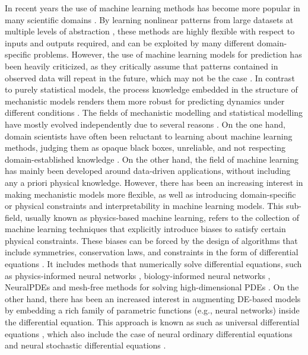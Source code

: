 In recent years the use of machine learning methods has become more popular in many scientific domains \cite{rasp2018, pichler2023, meuwly2021machine, borowiec2022, lai2024machine}. 
By learning nonlinear patterns from large datasets at multiple levels of abstraction \cite{LeCun2015}, these methods are highly flexible with respect to inputs and outputs required, and can be exploited by many different domain-specific problems.
However, the use of machine learning models for prediction has been heavily criticized, as they critically assume that patterns contained in observed data will repeat in the future, which may not be the case \cite{dormann2007,Barnosky2012}. 
In contrast to purely statistical models, the process knowledge embedded in the structure of mechanistic models renders them more robust for predicting dynamics under different conditions \cite{Barnosky2012}.
The fields of mechanistic modelling and statistical modelling have mostly evolved independently due to several reasons \cite{zdeborova_understanding_2020}. 
On the one hand, domain scientists have often been reluctant to learning about machine learning methods, judging them as opaque black boxes, unreliable, and not respecting domain-established knowledge \cite{Coveney:2016eb}. 
On the other hand, the field of machine learning has mainly been developed around data-driven applications, without including any a priori physical knowledge. 
However, there has been an increasing interest in making mechanistic models more flexible, as well as introducing domain-specific or physical constraints and interpretability in machine learning models. 
This sub-field, usually known as physics-based machine learning, refers to the collection of machine learning techniques that explicitly introduce biases to satisfy certain physical constraints. 
These biases can be forced by the design of algorithms that include symmetries, conservation laws, and constraints in the form of differential equations \cite{Karniadakis_Kevrekidis_Lu_Perdikaris_Wang_Yang_2021}. 
It includes methods that numerically solve differential equations, such as physics-informed neural networks \cite{PINNs_2019}, biology-informed neural networks \cite{Yazdani2020,Lagergren_Nardini_Baker_Simpson_Flores_2020}, NeuralPDEs \cite{Zubov_McCarthy_Ma_Calisto_Pagliarino_Azeglio_Bottero_Luján_Sulzer_Bharambe_et} and mesh-free methods for solving high-dimensional PDEs \cite{boussange2023a}. 
On the other hand, there has been an increased interest in augmenting DE-based models by embedding a rich family of parametric functions (e.g., neural networks) inside the differential equation.  
This approach is known as such as universal differential equations \cite{rackauckas2020universal, Dandekar_2020}, which also include the case of neural ordinary differential equations \cite{chen_neural_2019} and neural stochastic differential equations \cite{li2020scalable}.


